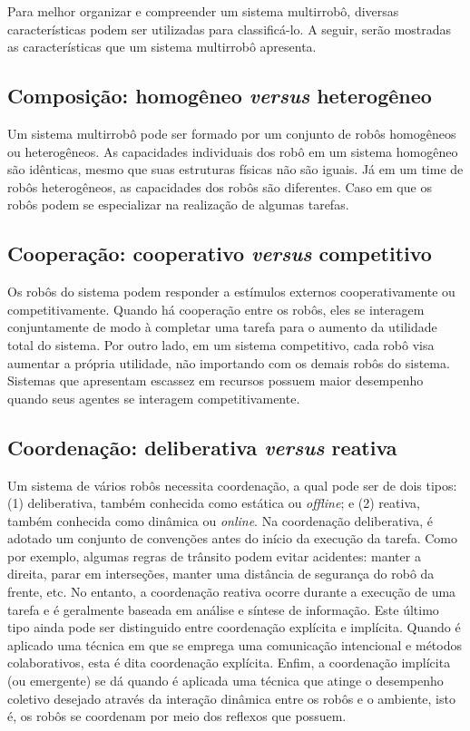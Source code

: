         Para melhor organizar e compreender um sistema multirrobô, diversas características podem ser utilizadas para classificá-lo. A seguir, serão mostradas as características que um sistema multirrobô apresenta.
        
        \subsection{Composição: homogêneo \textit{versus} heterogêneo}
            Um sistema multirrobô pode ser formado por um conjunto de robôs homogêneos ou heterogêneos. As capacidades individuais dos robô em um sistema homogêneo são idênticas, mesmo que suas estruturas físicas não são iguais. Já em um time de robôs heterogêneos, as capacidades dos robôs são diferentes. Caso em que os robôs podem se especializar na realização de algumas tarefas. %
        
        \subsection{Cooperação: cooperativo \textit{versus} competitivo}
            Os robôs do sistema podem responder a estímulos externos cooperativamente ou competitivamente. Quando há cooperação entre os robôs, eles se interagem conjuntamente de modo à completar uma tarefa para o aumento da utilidade total do sistema. Por outro lado, em um sistema competitivo, cada robô visa aumentar a própria utilidade, não importando com os demais robôs do sistema. Sistemas que apresentam escassez em recursos possuem maior desempenho quando seus agentes se interagem competitivamente.
        
        \subsection{Coordenação: deliberativa \textit{versus} reativa}
            Um sistema de vários robôs necessita coordenação, a qual pode ser de dois tipos: (1) deliberativa, também conhecida como estática ou \textit{offline}; e (2) reativa, também conhecida como dinâmica ou \textit{online}. Na coordenação deliberativa, é adotado um conjunto de convenções antes do início da execução da tarefa. Como por exemplo, algumas regras de trânsito podem evitar acidentes: manter a direita, parar em interseções, manter uma distância de segurança do robô da frente, etc. No entanto, a coordenação reativa ocorre durante a execução de uma tarefa e é geralmente baseada em análise e síntese de informação. Este último tipo ainda pode ser distinguido entre coordenação explícita e implícita. Quando é aplicado uma técnica em que se emprega uma comunicação intencional e métodos colaborativos, esta é dita coordenação explícita. Enfim, a coordenação implícita (ou emergente) se dá quando é aplicada uma técnica que atinge o desempenho coletivo desejado através da interação dinâmica entre os robôs e o ambiente, isto é, os robôs se coordenam por meio dos reflexos que possuem.
        
